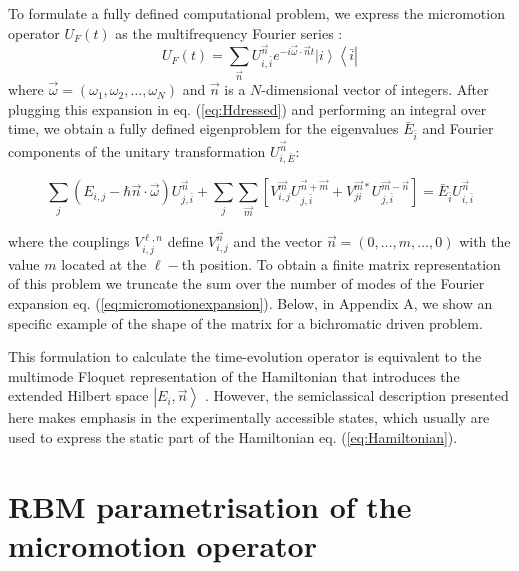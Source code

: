 \documentclass[pra,twocolumn,showkeys,preprintnumbers, amsmath,amssymb, aps,A4paper]{revtex4-1}
\begin{document}
To formulate a fully defined computational problem, we express the micromotion operator $U_F(t)$ as the multifrequency Fourier series \cite{ho1983semiclassical}:
\begin{equation}
U_F(t) = \sum_{\vec{n}} U_{i,\bar{i}}^{\vec{n}} e^{-i\vec{\omega} \cdot \vec{n}t} \left| i \right\rangle \left\langle \bar{i} \right|
\label{eq:micromotionexpansion}
\end{equation}
where $\vec{\omega} = (\omega_1,\omega_2,\ldots,\omega_N)$ and $\vec{n}$ is a $N$-dimensional vector of integers. After plugging this expansion in eq. (\ref{eq:Hdressed}) and performing an integral over time, we obtain a fully defined eigenproblem for the eigenvalues $\bar{E}_{\bar{i}}$ and Fourier components of the unitary transformation $U_{i,\bar{E}}^{\vec{n}}$:
\begin{widetext}
\begin{equation}
\sum_j(E_{i,j} - \hbar \vec{n} \cdot \vec{\omega})U^{\vec{n}}_{j,\bar{i}} + \sum_{j} \sum_{\vec{m}} \left[ V^{\vec{m}}_{i,j} U^{\vec{n}+\vec{m}}_{j,\bar{i}} + V^{\vec{m}*}_{ji} U^{\vec{m}-\vec{n}}_{j,\bar{i}}\right] = \bar{E}_{\bar{i}}U^{\vec{n}}_{i,\bar{i}}
\label{eq:multimodeeigenproblem}
\end{equation}
\end{widetext}
where the couplings $V_{i,j}^{\ell,n}$ define $V_{i,j}^{\vec{n}}$ and the vector $\vec{n} = (0,\ldots , m, \ldots, 0)$ with the value $m$ located at the $\ell-$th position. To obtain a finite matrix representation of this problem we truncate the sum over the number of modes of the Fourier expansion eq. (\ref{eq:micromotionexpansion}). Below, in Appendix A, we show an specific example of the shape of the matrix for a bichromatic driven problem. 

This formulation to calculate the time-evolution operator is equivalent to the multimode Floquet representation of the Hamiltonian that introduces the extended Hilbert space $\left| E_i,\vec{n} \right\rangle$  \cite{shirley1965solution,ho1983semiclassical,verdeny2016quasi}. However, the semiclassical description presented here makes emphasis in the experimentally accessible states, which usually are used to express the static part of the Hamiltonian eq.  (\ref{eq:Hamiltonian}). 


\section{RBM parametrisation of the micromotion operator}
\end{document}
